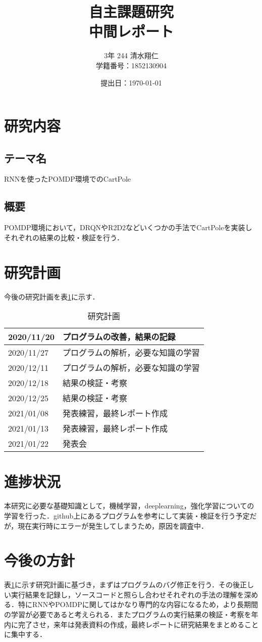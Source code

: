\documentclass[a4j]{jarticle}
\title {自主課題研究\\中間レポート\\}
\author {3年 244 清水翔仁 \\学籍番号：1852130904}
\date{\西暦 提出日：\today}
\begin{document}
  \maketitle
  \thispagestyle{empty}
  \newpage
  \setcounter{page}{1}
  \pagestyle{plain}

\section{研究内容}
  \subsection{テーマ名}
    RNNを使ったPOMDP環境でのCartPole
  \subsection{概要}
    POMDP環境において，DRQNやR2D2などいくつかの手法でCartPoleを実装しそれぞれの結果の比較・検証を行う．

\section{研究計画}
  今後の研究計画を表\ref{tab_plan}に示す．
    \begin{table}[!h]
      \centering
      \caption{研究計画}
      \label{tab_plan}
      \begin{tabular}{l|l}
      \hline
      2020/11/20 & プログラムの改善，結果の記録 \\
      \hline
      2020/11/27 & プログラムの解析，必要な知識の学習 \\
      \hline
      2020/12/11 & プログラムの解析，必要な知識の学習 \\
      \hline
      2020/12/18 & 結果の検証・考察 \\
      \hline
      2020/12/25 & 結果の検証・考察 \\
      \hline
      2021/01/08 & 発表練習，最終レポート作成 \\
      \hline
      2021/01/13 & 発表練習，最終レポート作成 \\
      \hline
      2021/01/22 & 発表会 \\
      \hline
      \end{tabular}
    \end{table}

\section{進捗状況}
  本研究に必要な基礎知識として，機械学習，deeplearning，強化学習についての学習を行った．github上にあるプログラムを参考にして実装・検証を行う予定だが，現在実行時にエラーが発生してしまうため，原因を調査中．

\section{今後の方針}
  表\ref{tab_plan}に示す研究計画に基づき，まずはプログラムのバグ修正を行う．その後正しい実行結果を記録し，ソースコードと照らし合わせそれぞれの手法の理解を深める．特にRNNやPOMDPに関してはかなり専門的な内容になるため，より長期間の学習が必要であると考えられる．またプログラムの実行結果の検証・考察を年内に完了させ，来年は発表資料の作成，最終レポートに研究結果をまとめることに集中する．
\end{document}

